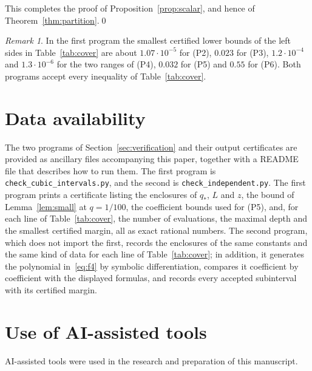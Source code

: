 \documentclass{amsart}
\numberwithin{equation}{section}
\numberwithin{table}{section}
\theoremstyle{definition}
\theoremstyle{remark}
\newtheorem{remark}[theorem]{Remark}
\newcommand{\qs}{q_{\ast}}
\begin{document}
This completes the proof of Proposition~\ref{prop:scalar}, and hence of Theorem~\ref{thm:partition}.\qed

\begin{remark}
In the first program the smallest certified lower bounds of the left sides in Table~\ref{tab:cover} are about $1.07\cdot10^{-5}$ for (P2), $0.023$ for (P3), $1.2\cdot10^{-4}$ and $1.3\cdot10^{-6}$ for the two ranges of (P4), $0.032$ for (P5) and $0.55$ for (P6). Both programs accept every inequality of Table~\ref{tab:cover}.
\end{remark}

\appendix

\section{Data availability}\label{app:data}
The two programs of Section~\ref{sec:verification} and their output certificates are provided as ancillary files accompanying this paper, together with a README file that describes how to run them. The first program is \texttt{check\_cubic\_intervals.py}, and the second is \texttt{check\_independent.py}. The first program prints a certificate listing the enclosures of $\qs$, $L$ and $z$, the bound of Lemma~\ref{lem:small} at $q=1/100$, the coefficient bounds used for (P5), and, for each line of Table~\ref{tab:cover}, the number of evaluations, the maximal depth and the smallest certified margin, all as exact rational numbers. The second program, which does not import the first, records the enclosures of the same constants and the same kind of data for each line of Table~\ref{tab:cover}; in addition, it generates the polynomial in~\eqref{eq:f4} by symbolic differentiation, compares it coefficient by coefficient with the displayed formulas, and records every accepted subinterval with its certified margin.

\section*{Use of AI-assisted tools}
AI-assisted tools were used in the research and preparation of this manuscript.
\end{document}
